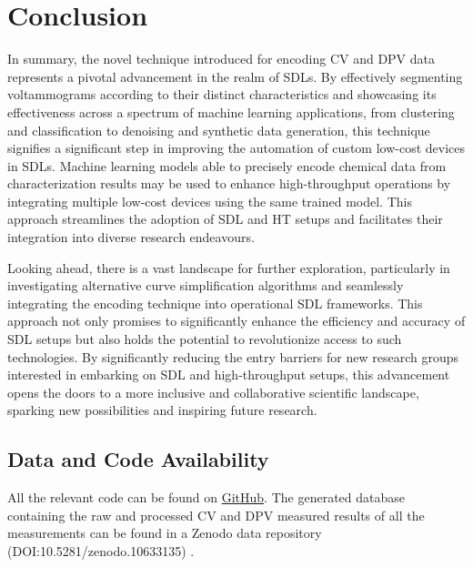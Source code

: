 \chapter{Conclusion} \label{chap:chap-5}
In summary, the novel technique introduced for encoding CV and DPV data represents a pivotal advancement in the realm of SDLs. By effectively segmenting voltammograms according to their distinct characteristics and showcasing its effectiveness across a spectrum of machine learning applications, from clustering and classification to denoising and synthetic data generation, this technique signifies a significant step in improving the automation of custom low-cost devices in SDLs. Machine learning models able to precisely encode chemical data from characterization results may be used to enhance high-throughput operations by integrating multiple low-cost devices using the same trained model. This approach streamlines the adoption of SDL and HT setups and facilitates their integration into diverse research endeavours.

Looking ahead, there is a vast landscape for further exploration, particularly in investigating alternative curve simplification algorithms and seamlessly integrating the encoding technique into operational SDL frameworks. This approach not only promises to significantly enhance the efficiency and accuracy of SDL setups but also holds the potential to revolutionize access to such technologies. By significantly reducing the entry barriers for new research groups interested in embarking on SDL and high-throughput setups, this advancement opens the doors to a more inclusive and collaborative scientific landscape, sparking new possibilities and inspiring future research.


\section{Data and Code Availability}
All the relevant code can be found on \href{https://github.com/raineyfu/Thesis}{GitHub}. The generated database containing the raw and processed CV and DPV measured results of all the measurements can be found in a Zenodo data repository (DOI:10.5281/zenodo.10633135) \cite{PabloGarca2024}.